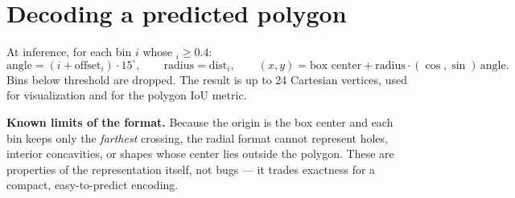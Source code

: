 \section{Decoding a predicted polygon}
At inference, for each bin $i$ whose $_i \geq 0.4$:
\[
\text{angle} = (i + \text{offset}_i)\cdot 15^\circ, \qquad
\text{radius} = \text{dist}_i, \qquad
(x,y) = \text{box center} + \text{radius}\cdot(\cos,\sin)\,\text{angle}.
\]
Bins below threshold are dropped. The result is up to 24 Cartesian vertices, used for
visualization and for the polygon IoU metric.

\begin{teacher}
\textbf{Known limits of the format.} Because the origin is the box center and each bin
keeps only the \emph{farthest} crossing, the radial format cannot represent holes,
interior concavities, or shapes whose center lies outside the polygon. These are
properties of the representation itself, not bugs --- it trades exactness for a compact,
easy-to-predict encoding.
\end{teacher}
